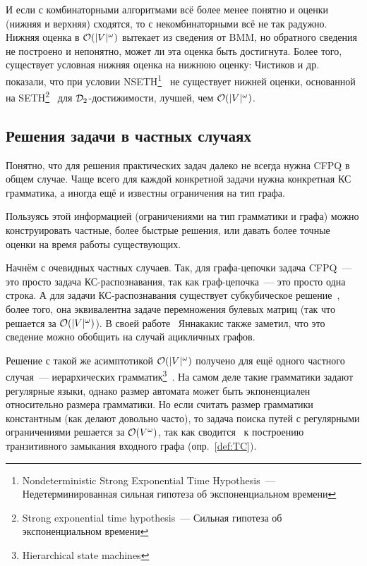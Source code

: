 И если с комбинаторными алгоритмами всё более менее понятно и оценки (нижняя и верхняя) сходятся, то с некомбинаторными всё не так радужно. Нижняя оценка в $\mathcal{O}(|V|^{\omega})$ вытекает из сведения от BMM, но обратного сведения не построено и непонятно, может ли эта оценка быть достигнута. Более того, существует условная нижняя оценка на нижнюю оценку: Чистиков и др.~\cite{Chistikov21} показали, что при условии NSETH\footnote{Nondeterministic Strong Exponential Time Hypothesis~--- Недетерминированная сильная гипотеза об экспоненциальном времени}~\cite{Carmosino16} не существует нижней оценки, основанной на SETH\footnote{Strong exponential time hypothesis~--- Сильная гипотеза об экспоненциальном времени}~\cite{Impagliazzo01} для $\mathcal{D}_2$-достижимости, лучшей, чем $\mathcal{O}(|V|^{\omega})$.

\subsection{Решения задачи в частных случаях}

Понятно, что для решения практических задач далеко не всегда нужна CFPQ в общем случае. Чаще всего для каждой конкретной задачи нужна конкретная КС грамматика, а иногда ещё и известны ограничения на тип графа.

Пользуясь этой информацией (ограничениями на тип грамматики и графа) можно конструировать частные, более быстрые решения, или давать более точные оценки на время работы существующих. 

Начнём с очевидных частных случаев. Так, для графа-цепочки задача CFPQ~--- это просто задача КС-распознавания, так как граф-цепочка~--- это просто одна строка. А для задачи КС-распознавания существует субкубическое решение~\cite{Valiant1975}, более того, она эквивалентна задаче перемножения булевых матриц (так что решается за $\mathcal{O}(|V|^{\omega})$). В своей работе~\cite{Yannakakis1990} Яннакакис также заметил, что это сведение можно обобщить на случай ацикличных графов.

Решение с такой же асимптотикой $\mathcal{O}(|V|^{\omega})$ получено для ещё одного частного случая~--- иерархических грамматик\footnote{Hierarchical state machines}~\cite{Yannakakis00}. На самом деле такие грамматики задают регулярные языки, однако размер автомата может быть экпоненциален относительно размера грамматики. Но если считать размер грамматики константным (как делают довольно часто), то задача поиска путей с регулярными ограничениями решается за $\mathcal{O}(V^{\omega})$, так как сводится~\cite{Yannakakis1990} к построению транзитивного замыкания входного графа (опр.~\ref{def:TC}).

